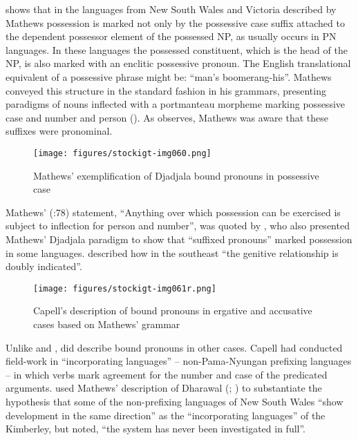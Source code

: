\citet[188--189]{koch_r_2008} shows that in the languages from New South Wales and Victoria described by Mathews possession is marked not only by the possessive case suffix attached to the dependent possessor element of the possessed NP, as usually occurs in PN languages. In these languages the possessed constituent, which is the head of the NP, is also marked with an enclitic possessive pronoun. The English translational equivalent of a possessive phrase might be: ``man’s boomerang-his''. Mathews conveyed this structure in the standard fashion in his grammars, presenting paradigms of nouns inflected with a portmanteau morpheme marking possessive case and number and person (). As \citet[194]{koch_r_2008} observes, Mathews was aware that these suffixes were pronominal.

\begin{figure}
\texttt{[image: figures/stockigt-img060.png]}
\caption{Mathews' exemplification of Djadjala bound pronouns in possessive case \citeyearpar[78]{mathews_aboriginal_1902}}
\label{fig:key:114}
\end{figure}

Mathews' (\citeyear{mathews_aboriginal_1902}:78) statement, “Anything over which possession can be exercised is subject to inflection for person and number”, was quoted by \citet[58]{capell_structure_1937}, who also presented Mathews' Djadjala paradigm to show that “suffixed pronouns” marked possession in some languages. \citet[55]{capell_structure_1937} described how in the southeast “the genitive relationship is doubly indicated”.


\begin{figure}[b]
\texttt{[image: figures/stockigt-img061r.png]}
\caption{Capell's description of bound pronouns in ergative and accusative cases based on Mathews' \citeyearpar{mathews_gundungurra_1901} grammar \citeyearpar[68]{capell_structure_1937}}
\label{fig:key:115}
\end{figure}

\largerpage
Unlike \citet{ray_aboriginal_1925} and \citet{elkin_nature_1937}, \citet[68--69]{capell_structure_1937} did describe bound pronouns in other cases. Capell had conducted field-work in “incorporating languages” – non-Pama-Nyungan prefixing languages – in which verbs mark agreement for the number and case of the predicated arguments. \citet[68]{capell_structure_1937} used Mathews' description of Dharawal (\citealt{mathews_gundungurra_1901}; ) to substantiate the hypothesis that some of the non-prefixing languages of New South Wales “show development in the same direction” as the “incorporating languages” of the Kimberley, but noted, “the system has never been investigated in full”.

